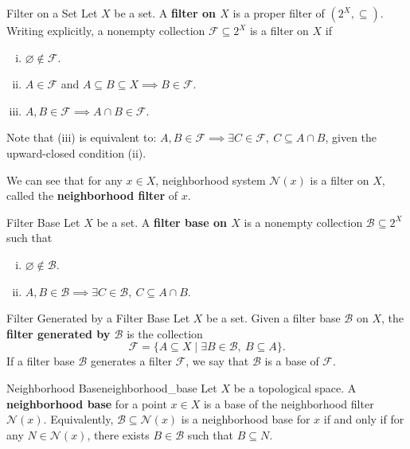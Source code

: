 \documentclass{report}
\begin{document}
\begin{definition}{Filter on a Set}{}
	Let $X$ be a set. A \textbf{filter on $X$} is a proper filter of $(2^X,\subseteq)$. Writing explicitly, a nonempty collection $\mathcal{F}\subseteq 2^X$ is a filter on $X$ if
	\begin{enumerate}[(i)]
		\item $\varnothing\notin\mathcal{F}$.
		\item $A\in\mathcal{F}$ and $A\subseteq B\subseteq X\implies B\in\mathcal{F}$.
		\item $A,B\in\mathcal{F}\implies A\cap B\in\mathcal{F}$.
	\end{enumerate}
\end{definition}

Note that (iii) is equivalent to: $A,B\in\mathcal{F}\implies \exists C\in\mathcal{F},\ C\subseteq A\cap B$, given the upward-closed condition (ii).

We can see that for any $x\in X$, neighborhood system $\mathcal{N}(x)$ is a filter on $X$, called the \textbf{neighborhood filter} of $x$.

\begin{definition}{Filter Base}{}
	Let $X$ be a set. A \textbf{filter base on $X$} is a nonempty collection $\mathcal{B}\subseteq 2^X$ such that
	\begin{enumerate}[(i)]
		\item $\varnothing\notin\mathcal{B}$.
		\item $A,B\in\mathcal{B}\implies \exists C\in\mathcal{B},\ C\subseteq A\cap B$.
	\end{enumerate}
\end{definition}

\begin{definition}{Filter Generated by a Filter Base}{}
	Let $X$ be a set. Given a filter base $\mathcal{B}$ on $X$, the \textbf{filter generated by $\mathcal{B}$} is the collection
	\[
		\mathcal{F}=\{A\subseteq X\mid \exists B\in\mathcal{B},\ B\subseteq A\}.
	\]
	If a filter base $\mathcal{B}$ generates a filter $\mathcal{F}$, we say that $\mathcal{B}$ is a base of $\mathcal{F}$.
\end{definition}

\begin{definition}{Neighborhood Base}{neighborhood_base}
	Let $X$ be a topological space. A \textbf{neighborhood base} for a point $x\in X$ is a base of the neighborhood filter $\mathcal{N}(x)$. Equivalently, $\mathcal{B}\subseteq\mathcal{N}(x)$ is a neighborhood base for $x$ if and only if for any $N\in\mathcal{N}(x)$, there exists $B\in\mathcal{B}$ such that $B\subseteq N$.
\end{definition}
\end{document}
